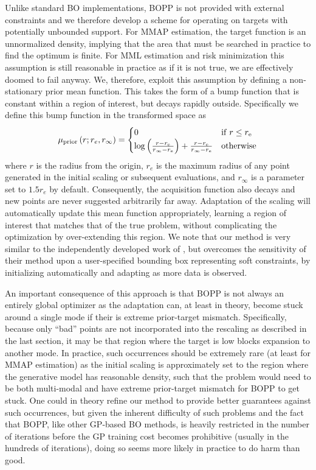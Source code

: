 Unlike standard BO implementations, BOPP is not provided with external constraints and we therefore 
develop a scheme for operating on targets with potentially unbounded support.  For MMAP estimation,
the target function is an unnormalized density, implying that the area that must 
be searched in practice to find the optimum is finite.  For MML estimation and risk minimization this
assumption is still reasonable in practice as if it is not true, we are effectively doomed to fail anyway.
We, therefore, exploit this assumption by defining a non-stationary prior mean function.  
This takes the form of a bump function that is constant within a region of interest, but decays rapidly 
outside.  Specifically we define this bump function in the transformed space as
\begin{align}
\label{eq:BUMP}
\mu_{\mathrm{prior}}\left(r;r_e,r_{\mathrm{\infty}}\right) = \begin{cases} 0  \hfill & \mathrm{if} \; r \leq r_{\mathrm{e}} \\ 
\log \left(\frac{r-r_{\mathrm{e}}}{r_{\mathrm{\infty}}-r_{\mathrm{e}}}\right)+\frac{r-r_{\mathrm{e}}}{r_{\mathrm{\infty}}-r_{\mathrm{e}}} & \mathrm{otherwise} \end{cases}
\end{align}
where $r$ is the radius from the origin, $r_e$ is the maximum radius of any point generated 
in the initial scaling or subsequent evaluations, and $r_{\mathrm{\infty}}$ is a parameter 
set to $1.5 r_{e}$ by default.  Consequently, the acquisition function also decays and new points 
are never suggested arbitrarily far away.  Adaptation of the scaling will automatically update this 
mean function appropriately, learning a region of interest that matches that of the true problem, 
without complicating the optimization by over-extending this region.  We note that our method 
is very similar to the independently developed work of \cite{shahriari2016unbounded}, but overcomes the 
sensitivity of their method upon a user-specified bounding box representing soft constraints, 
by initializing automatically and adapting as more data is observed.

An important consequence of this approach is that BOPP is not always an entirely
global optimizer as the adaptation can, at least in theory, become stuck around a single mode if
their is extreme prior-target mismatch.  Specifically, because only ``bad'' points 
are not incorporated into the rescaling as described in the last
section, it may be that region where the target is low blocks expansion to another mode.
In practice, such occurrences should be extremely rare (at least for MMAP estimation) as the
initial scaling is approximately set to the region where the generative model has reasonable density, such that
the problem would need to be both multi-modal and have extreme prior-target mismatch for BOPP to
get stuck.  One could in theory refine our method to provide better guarantees against such occurrences,
but given the inherent difficulty of such problems and the fact that BOPP, like other GP-based BO methods,
is heavily restricted in the number of iterations before the GP training cost becomes
prohibitive (usually in the hundreds of iterations), doing so seems more likely in practice to do harm than good.